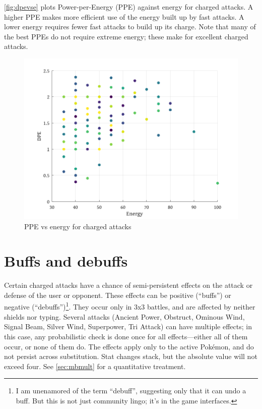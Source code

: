 \autoref{fig:dpevse} plots Power-per-Energy (PPE) against energy for charged attacks.
A higher PPE makes more efficient use of the energy built up by fast attacks.
A lower energy requires fewer fast attacks to build up its charge.
Note that many of the best PPEs do not require extreme energy; these make
 for excellent charged attacks.

\begin{figure}[ht]
\includegraphics[keepaspectratio,width=\textwidth]{octave/dpevse.png}
\caption{PPE vs energy for charged attacks}
\label{fig:dpevse}
\end{figure}

\section{Buffs and debuffs}
\label{sec:buffs}
Certain charged attacks have a chance of semi-persistent effects on the
  attack or defense of the user or opponent.
These effects can be positive (``buffs'') or negative (``debuffs'')\footnote{I am unenamored of the term ``debuff'',
  suggesting only that it can undo a buff. But this is not just community lingo; it's in the
  game interfaces.}.
They occur only in 3x3 battles, and are affected by neither shields nor typing.
Several attacks (Ancient Power, Obstruct, Ominous Wind, Signal Beam, Silver
  Wind, Superpower, Tri Attack) can have multiple effects; in this case, any
  probabilistic check is done once for all effects---either all of them
  occur, or none of them do.
The effects apply only to the active Pokémon, and do not persist across substitution.
Stat changes stack, but the absolute value will not exceed four.
See \autoref{sec:mbmult} for a quantitative treatment.

